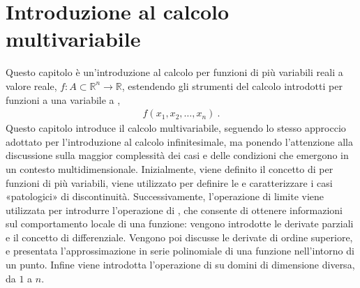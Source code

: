\documentclass[letterpaper,10pt,italian]{jupyterBook}
\begin{document}
\chapter{Introduzione al calcolo multi\sphinxhyphen{}variabile}
\label{\detokenize{ch/multivariable-calculus:introduzione-al-calcolo-multi-variabile}}\label{\detokenize{ch/multivariable-calculus:multivariable-calculus}}\label{\detokenize{ch/multivariable-calculus::doc}}
\sphinxAtStartPar
Questo capitolo è un’introduzione al calcolo per funzioni di più variabili reali a valore reale, \(f: A \subset \mathbb{R}^n \rightarrow \mathbb{R}\), estendendo gli strumenti del calcolo introdotti per funzioni a una variabile a {\hyperref[\detokenize{ch/precalculus/multivariable-real-fun:math-hs-precalculus-multivariable-real-fun}]{}},
\begin{equation*}
\begin{split}f(x_1, x_2, \dots, x_n) \ .\end{split}
\end{equation*}
\sphinxAtStartPar
{} Questo capitolo introduce il calcolo multivariabile, seguendo lo stesso approccio adottato per l’introduzione al calcolo infinitesimale, ma ponendo l’attenzione alla discussione sulla maggior complessità dei casi e delle condizioni che emergono in un contesto multidimensionale.
Inizialmente, viene definito il concetto di {\hyperref[\detokenize{ch/multivariable-calculus/limits:multivariable-calculus-limit}]{}} per funzioni di più variabili, viene utilizzato per definire le {\hyperref[\detokenize{ch/multivariable-calculus/limits:multivariable-calculus-continuity}]{}} e caratterizzare i casi «patologici» di discontinuità.
Successivamente, l’operazione di limite viene utilizzata per introdurre l’operazione di {\hyperref[\detokenize{ch/multivariable-calculus/derivatives:multivariable-calculus-derivatives}]{}}, che consente di ottenere informazioni sul comportamento locale di una funzione: vengono introdotte le derivate parziali e il concetto di differenziale. Vengono poi discusse le derivate di ordine superiore, e presentata l’approssimazione in serie polinomiale di una funzione nell’intorno di un punto.
Infine viene introdotta l’operazione di {\hyperref[\detokenize{ch/multivariable-calculus/integrals:multivariable-calculus-integrals}]{}} su domini di dimensione diversa, da \(1\) a \(n\).
\end{document}
